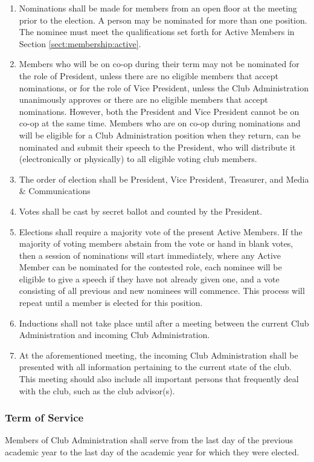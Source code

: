 \documentclass[english,11pt]{article}
\begin{document}
\begin{enumerate}[label=\alph*.]
    \item Nominations shall be made for members from an open floor at the meeting prior to the election.
          A person may be nominated for more than one position. The nominee must meet the qualifications set forth for Active Members in Section \ref{sect:membership:active}.
    \item Members who will be on co-op during their term may not be nominated for the role of President, unless there are no eligible members that accept nominations, or for the role of Vice President, unless the Club Administration unanimously approves or there are no eligible members that accept nominations.
          However, both the President and Vice President cannot be on co-op at the same time.
          Members who are on co-op during nominations and will be eligible for a Club Administration position when they return, can be nominated and submit their speech to the President, who will distribute it (electronically or physically) to all eligible voting club members.
    \item The order of election shall be President, Vice President, Treasurer, and Media \& Communications
    \item Votes shall be cast by secret ballot and counted by the President.
    \item Elections shall require a majority vote of the present Active Members.
          If the majority of voting members abstain from the vote or hand in blank votes, then a session of nominations will start immediately, where any Active Member can be nominated for the contested role, each nominee will be eligible to give a speech if they have not already given one, and a vote consisting of all previous and new nominees will commence.
          This process will repeat until a member is elected for this position.
    \item Inductions shall not take place until after a meeting between the current Club Administration and incoming Club Administration.
    \item At the aforementioned meeting, the incoming Club Administration shall be presented with all information pertaining to the current state of the club.
          This meeting should also include all important persons that frequently deal with the club, such as the club advisor(s).
\end{enumerate}

\subsubsection{Term of Service} \label{subsect:cadmin:selection:terms}
Members of Club Administration shall serve from the last day of the previous academic year to the last day of the academic year for which they were elected.
\end{document}
